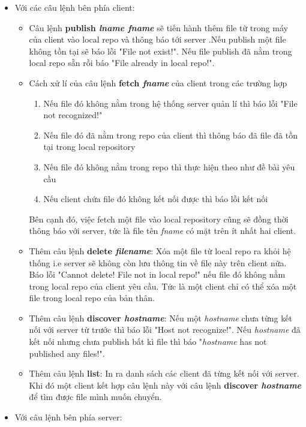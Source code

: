 \documentclass[a4paper]{article}
\begin{document}
	\begin{itemize}
		\item Với các câu lệnh bên phía client:
		\begin{itemize}
			\item Câu lệnh \textbf{publish \textit{lname fname}} sẽ tiến hành thêm file từ trong máy của client vào local repo và thông báo tới server .Nếu publish một file không tồn tại sẽ báo lỗi "File not exist!". Nếu file publish đã nằm trong local repo sẵn rồi báo "File already in local repo!".
			\item Cách xử lí của câu lệnh \textbf{fetch \textit{fname}} của client trong các trường hợp
			\begin{enumerate}
				\item Nếu file đó không nằm trong hệ thống server quản lí thì báo lỗi "File not recognized!"
				\item Nếu file đó đã nằm trong repo của client thì thông báo đã file đã tồn tại trong local repository
				\item Nếu file đó không nằm trong repo thì thực hiện theo như đề bài yêu cầu
				\item Nếu client chứa file đó không kết nối được thì báo lỗi kết nối 
			\end{enumerate}
			Bên cạnh đó, việc fetch một file vào local repository cũng sẽ đồng thời thông báo với server, tức là file tên \textit{fname} có mặt trên ít nhất hai client.
			\item Thêm câu lệnh \textbf{delete \textit{filename}}: Xóa một file từ local repo ra khỏi hệ thống i.e server sẽ không còn lưu thông tin về file này trên client nữa.
			Báo lỗi "Cannot delete! File not in local repo!" nếu file đó không nằm trong local repo của client yêu cầu. Tức là một client chỉ có thể xóa một file trong local repo của bản thân.
			\item Thêm câu lệnh \textbf{discover \textit{hostname}}: Nếu một \textit{hostname} chưa từng kết nối với server từ trước thì báo lỗi "Host not recognize!". Nếu \textit{hostname} đã kết nối nhưng chưa publish bất kì file thì báo "\textit{hostname} has not published any files!".
			\item Thêm câu lệnh \textbf{list}: In ra danh sách các client đã từng kết nối với server. Khi đó một client kết hợp câu lệnh này với câu lệnh \textbf{discover \textit{hostname}} để tìm được file mình muốn chuyển.
		\end{itemize}
		\item Với câu lệnh bên phía server:
		\begin{itemize}

\end{itemize}
\end{itemize}
\end{document}
